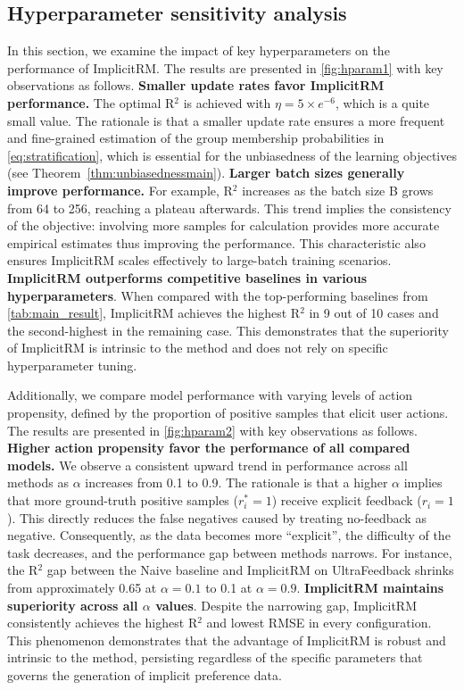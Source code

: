 \documentclass[]{arxiv_singlecolumn}
\theoremstyle{plain}
\theoremstyle{definition}
\theoremstyle{remark}
\begin{document}
\subsection{Hyperparameter sensitivity analysis}\label{sec:hyper}
In this section, we examine the impact of key hyperparameters on the performance of ImplicitRM. The results are presented in \autoref{fig:hparam1} with key observations as follows. 
 \textbf{Smaller update rates favor ImplicitRM performance.}  The optimal R$^2$ is achieved with $\eta=5\times e^{-6}$, which is a quite small value. The rationale is that a smaller update rate ensures a more frequent and fine-grained estimation of the group membership probabilities in \eqref{eq:stratification}, which is essential for the unbiasedness of the learning objectives (see Theorem~\ref{thm:unbiasednessmain}).
 \textbf{Larger batch sizes generally improve performance.} For example, R$^2$ increases as the batch size B grows from 64 to 256, reaching a plateau afterwards. This trend  implies the consistency of the objective: involving more samples for calculation provides more accurate empirical estimates thus improving the performance. This characteristic also ensures ImplicitRM scales effectively to large-batch training scenarios.
 \textbf{ImplicitRM outperforms competitive baselines in various hyperparameters}. When compared with the top-performing baselines from \autoref{tab:main_result}, ImplicitRM achieves the highest R$^2$ in 9 out of 10 cases and the second-highest in the remaining case. This demonstrates that the superiority of ImplicitRM is intrinsic to the method and does not rely on specific hyperparameter tuning.

Additionally, we compare model performance with varying levels of action propensity, defined by the proportion of positive samples that elicit user actions. The results are presented in \autoref{fig:hparam2} with key observations as follows. 
 \textbf{Higher action propensity favor the performance of all compared models.} We observe a consistent upward trend in performance across all methods as $\alpha$ increases from 0.1 to 0.9. The rationale is that a higher $\alpha$  implies that more ground-truth positive samples ($r^*_i=1$) receive explicit feedback ($r_i=1$). This directly reduces the false negatives caused by treating no-feedback as negative. Consequently, as the data becomes more ``explicit'', the difficulty of the task decreases, and the performance gap between methods narrows. For instance, the R$^2$ gap between the Naive baseline and ImplicitRM on UltraFeedback shrinks from approximately 0.65 at  $\alpha=0.1$ to 0.1 at $\alpha=0.9$.
 \textbf{ImplicitRM maintains superiority across all  $\alpha$ values}. Despite the narrowing gap, ImplicitRM consistently achieves the highest R$^2$ and lowest RMSE in every configuration. This phenomenon demonstrates that the advantage of ImplicitRM is robust and intrinsic to the method, persisting regardless of the specific parameters that governs the generation of implicit preference data.
\end{document}
